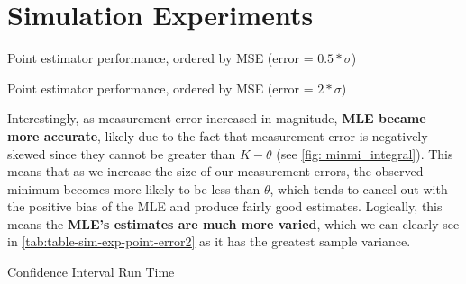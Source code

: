 
\section{Simulation Experiments}

\begin{table}[ht]
    \centering
    \caption{Point estimator performance, ordered by MSE (error = $0.5*\sigma$)}
    
    \label{tab:table-sim-exp-point-error0.5}
\end{table}

\begin{table}[ht]
    \centering
    \caption{Point estimator performance, ordered by MSE (error = $2*\sigma$)}
    
    \label{tab:table-sim-exp-point-error2}
\end{table}

Interestingly, as measurement error increased in magnitude, \textbf{MLE became more accurate}, likely due to the fact that measurement error is negatively skewed since they cannot be greater than $K-\theta$ (see \autoref{fig: minmi_integral}). This means that as we increase the size of our measurement errors, the observed minimum becomes more likely to be less than $\theta$, which tends to cancel out with the positive bias of the MLE and produce fairly good estimates. Logically, this means the \textbf{MLE's estimates are much more varied}, which we can clearly see in \autoref{tab:table-sim-exp-point-error2} as it has the greatest sample variance.

\begin{table}[ht]
    \centering
    \caption{Confidence Interval Run Time}
    
    \label{tab:table-sim-exp-runtime}
\end{table}
\clearpage

